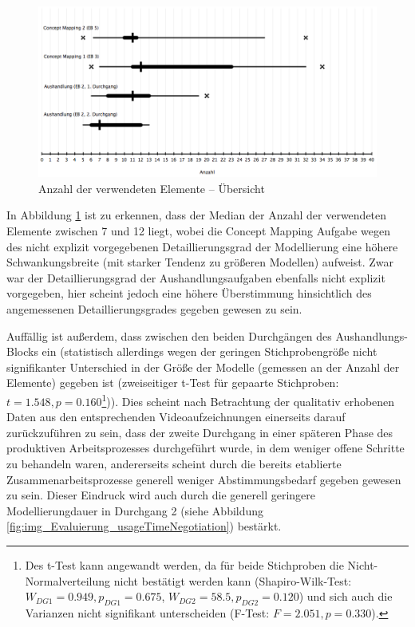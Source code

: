 \begin{figure}[htbp]
	\centering
		\includegraphics[width=15cm]{img/Evaluierung/elementUsageBlocksOverview.png}
	\caption{Anzahl der verwendeten Elemente -- Übersicht}
	\label{fig:img_Evaluierung_elementUsageBlocksOverview}
\end{figure}

In Abbildung \ref{fig:img_Evaluierung_elementUsageBlocksOverview} ist zu erkennen, dass der Median der Anzahl der verwendeten Elemente zwischen 7 und 12 liegt, wobei die Concept Mapping Aufgabe wegen des nicht explizit vorgegebenen Detaillierungsgrad der Modellierung eine höhere Schwankungsbreite (mit starker Tendenz zu größeren Modellen) aufweist. Zwar war der Detaillierungsgrad der Aushandlungsaufgaben ebenfalls nicht explizit vorgegeben, hier scheint jedoch eine höhere Überstimmung hinsichtlich des angemessenen Detaillierungsgrades gegeben gewesen zu sein. 

Auffällig ist außerdem, dass zwischen den beiden Durchgängen des Aushandlungs-Blocks ein (statistisch allerdings wegen der geringen Stichprobengröße nicht signifikanter Unterschied in der Größe der Modelle (gemessen an der Anzahl der Elemente) gegeben ist (zweiseitiger t-Test für gepaarte Stichproben: $t=1.548, p=0.160$\footnote{Des t-Test kann angewandt werden, da für beide Stichproben die Nicht-Normalverteilung nicht bestätigt werden kann (Shapiro-Wilk-Test: $W_{DG1}=0.949, p_{DG1}=0.675$, $W_{DG2}=58.5, p_{DG2}=0.120$) und sich auch die Varianzen nicht signifikant unterscheiden (F-Test: $F=2.051, p=0.330$).})). Dies scheint nach Betrachtung der qualitativ erhobenen Daten aus den entsprechenden Videoaufzeichnungen einerseits darauf zurückzuführen zu sein, dass der zweite Durchgang in einer späteren Phase des produktiven Arbeitsprozesses durchgeführt wurde, in dem weniger offene Schritte zu behandeln waren, andererseits scheint durch die bereits etablierte Zusammenarbeitsprozesse generell weniger Abstimmungsbedarf gegeben gewesen zu sein. Dieser Eindruck wird auch durch die generell geringere Modellierungdauer in Durchgang 2 (siehe Abbildung \ref{fig:img_Evaluierung_usageTimeNegotiation}) bestärkt.

